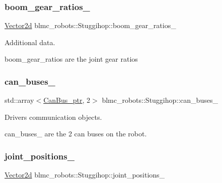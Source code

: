 \subsubsection{\texorpdfstring{boom\+\_\+gear\+\_\+ratios\+\_\+}{boom\_gear\_ratios\_}}
{\footnotesize\ttfamily \hyperlink{common__header_8hpp_acb6916bc8c9fe9d98c484fd4cc201447}{Vector2d} blmc\+\_\+robots\+::\+Stuggihop\+::boom\+\_\+gear\+\_\+ratios\+\_\+\hspace{0.3cm}{\ttfamily [private]}}



Additional data. 

boom\+\_\+gear\+\_\+ratios are the joint gear ratios \mbox{\label{classblmc__robots_1_1Stuggihop_a708d4483e73a19b8e98dd33d0c22e2aa}} 
\subsubsection{\texorpdfstring{can\+\_\+buses\+\_\+}{can\_buses\_}}
{\footnotesize\ttfamily std\+::array$<$\hyperlink{common__header_8hpp_a793c8789a7598e8aaf766939da7262af}{Can\+Bus\+\_\+ptr}, 2$>$ blmc\+\_\+robots\+::\+Stuggihop\+::can\+\_\+buses\+\_\+\hspace{0.3cm}{\ttfamily [private]}}



Drivers communication objects. 

can\+\_\+buses\+\_\+ are the 2 can buses on the robot. \mbox{\label{classblmc__robots_1_1Stuggihop_a9426a6b5b97a1d57a4db4691f0f4eac5}} 
\subsubsection{\texorpdfstring{joint\+\_\+positions\+\_\+}{joint\_positions\_}}
{\footnotesize\ttfamily \hyperlink{common__header_8hpp_acb6916bc8c9fe9d98c484fd4cc201447}{Vector2d} blmc\+\_\+robots\+::\+Stuggihop\+::joint\+\_\+positions\+\_\+\hspace{0.3cm}{\ttfamily [private]}}



